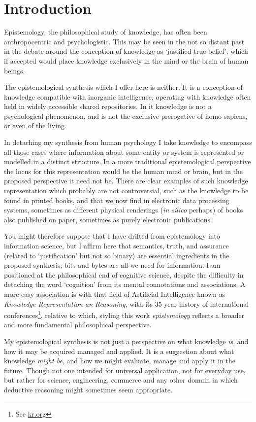 \documentclass[10pt,titlepage]{book}
\begin{document}
\chapter{Introduction}

Epistemology, the philosophical study of knowledge, has often been anthropocentric and psychologistic.
This may be seen in the not so distant past in the debate around the conception of knowledge as `justified true belief', which if accepted would place knowledge exclusively in the mind or the brain of human beings.

The epistemological synthesis which I offer here is neither.
It is a conception of knowledge compatible with inorganic intelligence, operating with knowledge often held in widely accessible shared repositories.
In it knowledge is not a psychological phenomenon, and is not the exclusive prerogative of homo sapiens, or even of the living.

In detaching my synthesis from human psychology I take knowledge to encompass all those cases where information about some entity or system is represented or modelled in a distinct structure.
In a more traditional epistemological perspective the locus for this representation would be the human mind or brain, but in the proposed perspective it need not be.
There are clear examples of such knowledge representation which probably are not controversial, such as the knowledge to be found in printed books, and that we now find in electronic data processing systems, sometimes as different physical renderings (\emph{in silico} perhaps) of books also published on paper, sometimes as purely electronic publications.

You might therefore suppose that I have drifted from epistemology into information science, but I affirm here that semantics, truth, and assurance (related to `justification' but not so binary) are essential ingredients in the proposed synthesis; bits and bytes are all we need for information.
I am positioned at the philosophical end of cognitive science, despite the difficulty in detaching the word `cognition' from its mental connotations and associations.
A more easy association is with that field of Artificial Intelligence known as \emph{Knowledge Representation an Reasoning}, with its 35 year history of international conferences\footnote{See \href{http://kr.org/}{kr.org}}, relative to which, styling this work \emph{epistemology} reflects a broader and more fundamental philosophical perspective.

My epistemological synthesis is not just a perspective on what knowledge \emph{is}, and how it may be acquired managed and applied.
It is a suggestion about what knowledge \emph{might be}, and how we might evaluate, manage and apply it in the future.
Though not one intended for universal application, not for everyday use, but rather for science, engineering, commerce and any other domain in which deductive reasoning might sometimes seem appropriate.
\end{document}

